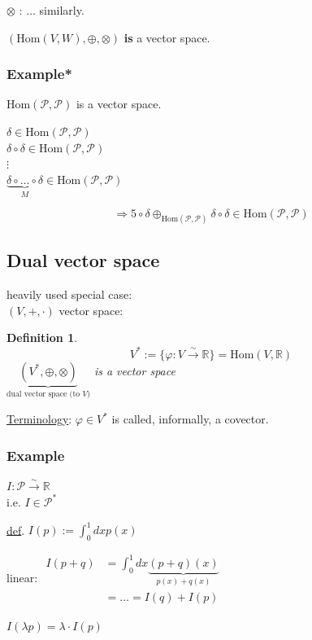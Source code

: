 \documentclass[10pt]{amsart}
\newtheorem{definition}{Definition}
\begin{document}
\begin{multicols*}{2}
$\otimes$ : $\dots$ similarly.  

$(\text{Hom}(V,W), \oplus, \otimes)$ \textbf{is} a vector space.

\subsubsection{Example*} $\text{Hom}(\mathcal{P},\mathcal{P})$ is a vector space.

$\delta \in \text{Hom}(\mathcal{P},\mathcal{P})$ \\
$\delta \circ \delta \in \text{Hom}(\mathcal{P},\mathcal{P})$ \\
$\vdots$ \\
$\underbrace{ \delta \circ \dots \circ \delta }_{ M} \in \text{Hom}(\mathcal{P}, \mathcal{P})$

\[
\Longrightarrow 5 \circ \delta \oplus_{\text{Hom}(\mathcal{P},\mathcal{P})} \delta \circ \delta \in \text{Hom}(\mathcal{P},\mathcal{P})
\]

\subsection{Dual vector space}

heavily used special case: \\
$(V,+,\cdot)$ vector space:  
\begin{definition}
	\[
	V^* := \lbrace \varphi : V \xrightarrow{ \sim } \mathbb{R} \rbrace = \text{Hom}(V,\mathbb{R})
	\]
	$\underbrace{ (V^*, \oplus, \otimes) }_{\text{dual vector space (to $V$)}}$ is a vector space
\end{definition}

\underline{Terminology}: $\varphi \in V^*$ is called, informally, a covector.  

\subsubsection*{Example} $I : \mathcal{P} \xrightarrow{ \sim} \mathbb{R}$ \\
i.e. $I \in \mathcal{P}^*$

\underline{def}. $I(p) := \int_0^1 dx p(x)$

linear: $\begin{aligned}  I(p+q) & = \int_0^1 dx \underbrace{ ( p+q)(x) }_{p(x) + q(x)} \\
& = \dots = I(q) + I(p) \end{aligned}$

$I(\lambda p) = \lambda \cdot I(p)$


\end{multicols*}
\end{document}
